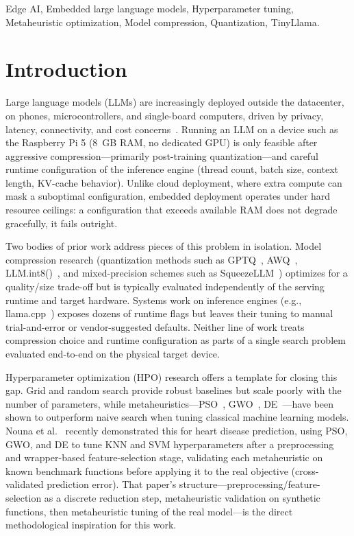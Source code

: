\documentclass[journal]{IEEEtran}
\begin{document}
\begin{IEEEkeywords}
Edge AI, Embedded large language models, Hyperparameter tuning, Metaheuristic optimization, Model compression, Quantization, TinyLlama.
\end{IEEEkeywords}


\section{Introduction}
\label{sec:introduction}

Large language models (LLMs) are increasingly deployed outside the datacenter, on phones, microcontrollers, and single-board computers, driven by privacy, latency, connectivity, and cost concerns~\cite{ref17}. Running an LLM on a device such as the Raspberry Pi 5 (8~GB RAM, no dedicated GPU) is only feasible after aggressive compression---primarily post-training quantization---and careful runtime configuration of the inference engine (thread count, batch size, context length, KV-cache behavior). Unlike cloud deployment, where extra compute can mask a suboptimal configuration, embedded deployment operates under hard resource ceilings: a configuration that exceeds available RAM does not degrade gracefully, it fails outright.

Two bodies of prior work address pieces of this problem in isolation. Model compression research (quantization methods such as GPTQ~\cite{ref4}, AWQ~\cite{ref5}, LLM.int8()~\cite{ref6}, and mixed-precision schemes such as SqueezeLLM~\cite{ref7}) optimizes for a quality/size trade-off but is typically evaluated independently of the serving runtime and target hardware. Systems work on inference engines (e.g., llama.cpp~\cite{ref3}) exposes dozens of runtime flags but leaves their tuning to manual trial-and-error or vendor-suggested defaults. Neither line of work treats compression choice and runtime configuration as parts of a single search problem evaluated end-to-end on the physical target device.

Hyperparameter optimization (HPO) research offers a template for closing this gap. Grid and random search provide robust baselines but scale poorly with the number of parameters, while metaheuristics---PSO~\cite{ref8}, GWO~\cite{ref9}, DE~\cite{ref10}---have been shown to outperform naive search when tuning classical machine learning models. Nouna et al.~\cite{ref11} recently demonstrated this for heart disease prediction, using PSO, GWO, and DE to tune KNN and SVM hyperparameters after a preprocessing and wrapper-based feature-selection stage, validating each metaheuristic on known benchmark functions before applying it to the real objective (cross-validated prediction error). That paper's structure---preprocessing/feature-selection as a discrete reduction step, metaheuristic validation on synthetic functions, then metaheuristic tuning of the real model---is the direct methodological inspiration for this work.
\end{document}
